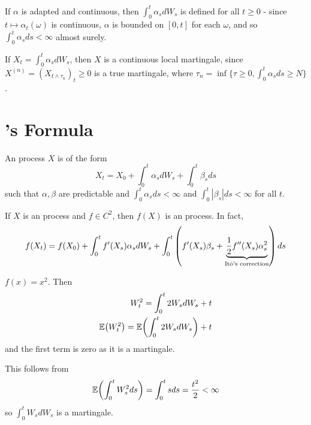 \begin{thm}
  \label{defn:continuous_time:8}
  If $\alpha$ is adapted and continuous, then $\int_{0}^{t} \alpha_{s}
  dW_{s}$ is defined for all $t \geq 0$ - since $t \mapsto
  \alpha_{t}(\omega)$ is continuous, $\alpha$ is bounded on $[0, t]$
  for each $\omega$, and so $\int_{0}^{t} \alpha_{s} ds < \infty$
  almost surely.

  If $X_{t} = \int_{0}^{t} \alpha_{s} dW_{s}$, then $X$ is a
  continuous local martingale, since $X^{(n)} = (X_{t \wedge
    \tau_{n}})_{t} \geq 0$ is a true martingale, where $\tau_{n} = \inf
  \{ \tau \geq 0, \int_{0}^{t} \alpha_{s} ds \geq N \}$.
\end{thm}



\section{\ito's Formula}
\label{sec:itos-formula}

\begin{defn}
  \label{defn:continuous_time:9}
  An \ito process $X$ is of the form
  \begin{equation}
    \label{eq:36}
    X_{t} = X_{0} + \int_{0}^{t} \alpha_{s} dW_{s} + \int_{0}^{t}
    \beta_{s} ds
  \end{equation}
  such that $\alpha, \beta$ are predictable and $\int_{0}^{t}
  \alpha_{s} ds < \infty$ and $\int_{0}^{t} |\beta_{s}| ds < \infty$
  for all $t$.
\end{defn}

\begin{thm}
  \label{defn:continuous_time:10}
  If $X$ is an \ito process and $f \in C^{2}$, then $f(X)$ is an \ito
  process.  In fact,
  \begin{equation}
    \label{eq:37}
    f(X_{t}) = f(X_{0}) + \int_{0}^{t} f'(X_{s}) \alpha_{s} dW_{s} +
    \int_{0}^{t} \left( f'(X_{s}) \beta_{s} + \underbrace{\frac{1}{2}f''(X_{s})
      \alpha_{s}^{2}}_{\text{\ito's correction}} \right) ds
  \end{equation}
\end{thm}

\begin{exmp}
  \label{defn:continuous_time:11}
  $f(x) = x^{2}$. Then
  \begin{align}
    \label{eq:38}
    W_{t}^{2} = \int_{0}^{t} 2 W_{s} dW_{s} + t \\
    \E{W_{t}^{2}} = \E{\int_{0}^{t} 2 W_{s} dW_{s}} + t
  \end{align} and the first term is zero as it is a martingale.

  This follows from
  \begin{equation}
    \label{eq:39}
    \E{\int_{0}^{t} W_{s}^{2} ds} = \int_{0}^{t} s ds =
    \frac{t^{2}}{2} < \infty
  \end{equation} so $\int_{0}^{t} W_{s} dW_{s}$ is a martingale.
\end{exmp}

